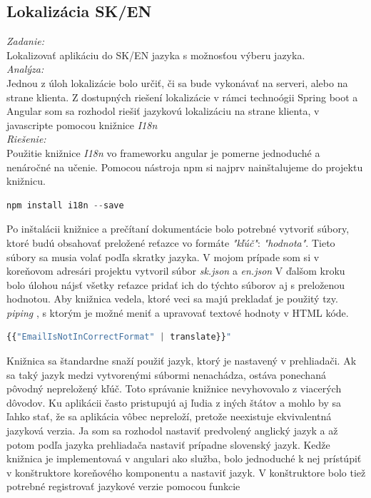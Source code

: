 \documentclass[11pt, oneside]{report}
\begin{document}
\subsection{Lokalizácia SK/EN}
\textit{Zadanie:}\\
Lokalizovať aplikáciu do SK/EN jazyka s možnosťou výberu jazyka.
\\\textit{Analýza:}\\
Jednou z  úloh  lokalizácie bolo určiť, či sa bude vykonávať na serveri, alebo na strane klienta. Z dostupných riešení lokalizácie v rámci technoógii Spring boot a Angular  som sa rozhodol riešiť jazykovú lokalizáciu na strane klienta, v javascripte pomocou knižnice \textit{I18n}\cite{i18n}
\\\textit{Riešenie:}\\
Použitie knižnice \textit{I18n} vo frameworku angular je pomerne jednoduché a nenáročné na učenie. Pomocou nástroja npm si najprv nainštalujeme do projektu knižnicu.
\begin{lstlisting}[language=javascript,showstringspaces=false]
			             	         npm install i18n --save
\end{lstlisting}
Po inštalácii knižnice a  prečítaní dokumentácie  bolo  potrebné vytvoriť súbory, ktoré budú obsahovať preložené reťazce vo formáte \textit{"kľúč"}: \textit{"hodnota"}. Tieto súbory sa  musia volať podľa skratky jazyka. V mojom prípade som si v koreňovom adresári projektu vytvoril súbor \textit{sk.json} a \textit{en.json} V ďalšom kroku  bolo úlohou nájsť všetky reťazce pridať ich do  týchto súborov  aj  s preloženou hodnotou. Aby knižnica vedela, ktoré  veci sa majú prekladať je  použitý tzy. \textit{piping} , s ktorým je možné meniť a upravovať textové hodnoty v HTML kóde.
\begin{lstlisting}[language=Javascript, showstringspaces=false,caption= String interpolation s použitím pipingu na preklad,captionpos=b]
		  		        {{"EmailIsNotInCorrectFormat" | translate}}"
\end{lstlisting}
Knižnica sa štandardne snaží použiť jazyk, ktorý je nastavený v prehliadači. Ak sa taký jazyk  medzi vytvorenými súbormi nenachádza, ostáva ponechaná pôvodný nepreložený kľúč. Toto správanie knižnice  nevyhovovalo z viacerých dôvodov. Ku aplikácii často pristupujú aj ľudia z iných štátov a mohlo by sa ľahko stať, že sa aplikácia vôbec nepreloží, pretože neexistuje ekvivalentná jazyková verzia. Ja som sa rozhodol  nastaviť predvolený anglický jazyk a až potom podľa jazyka prehliadača  nastaviť  prípadne slovenský jazyk. Kedže knižnica je implementovaá v angulari ako služba, bolo jednoduché k nej prístúpiť v konštruktore koreňového komponentu a nastaviť jazyk. V konštruktore bolo  tiež potrebné registrovať jazykové verzie pomocou funkcie%
\end{document}
